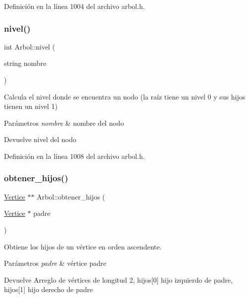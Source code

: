 Definición en la línea 1004 del archivo arbol.\+h.

\mbox{\label{classArbol_a3a8a414e8e3f45bf90c481649928a86d}} 
\subsubsection{\texorpdfstring{nivel()}{nivel()}\hspace{0.1cm}{\footnotesize\ttfamily [2/2]}}
{\footnotesize\ttfamily int Arbol\+::nivel (\begin{DoxyParamCaption}\item[{string}]{nombre }\end{DoxyParamCaption})}



Calcula el nivel donde se encuentra un nodo (la raíz tiene un nivel 0 y sus hijos tienen un nivel 1) 


\begin{DoxyParams}{Parámetros}
{\em nombre} & nombre del nodo \\
\hline
\end{DoxyParams}
\begin{DoxyReturn}{Devuelve}
nivel del nodo 
\end{DoxyReturn}


Definición en la línea 1008 del archivo arbol.\+h.

\mbox{\label{classArbol_a18066699977ab8095398d026ef2a13ac}} 
\subsubsection{\texorpdfstring{obtener\+\_\+hijos()}{obtener\_hijos()}}
{\footnotesize\ttfamily \hyperlink{classVertice}{Vertice} $\ast$$\ast$ Arbol\+::obtener\+\_\+hijos (\begin{DoxyParamCaption}\item[{\hyperlink{classVertice}{Vertice} $\ast$}]{padre }\end{DoxyParamCaption})\hspace{0.3cm}{\ttfamily [protected]}}



Obtiene los hijos de un vértice en orden ascendente. 


\begin{DoxyParams}{Parámetros}
{\em padre} & vértice padre \\
\hline
\end{DoxyParams}
\begin{DoxyReturn}{Devuelve}
Arreglo de vértices de longitud 2, hijos\mbox{[}0\mbox{]} hijo izquierdo de padre, hijos\mbox{[}1\mbox{]} hijo derecho de padre 
\end{DoxyReturn}


